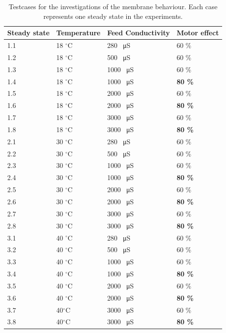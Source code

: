\begin{table}[H]
\centering
\begin{tabular}{|p{1.4cm}||p{2cm}|p{3.2cm}|p{1.8cm}|}
 \hline
 \textbf{Steady state }&Temperature&Feed Conductivity&Motor effect \\
 \hline
 1.1 & 18 $^\circ$C   & 280 \SI{}{\micro\siemens} & 60 \% \\
 1.2   &  18 $^\circ$C   & 500 \SI{}{\micro\siemens} & 60 \% \\
 1.3 &  18 $^\circ$C  &1000 \SI{}{\micro\siemens} & 60 \% \\
 1.4 &  18 $^\circ$C  &1000 \SI{}{\micro\siemens} & \textbf{80 \%} \\
 1.5 &18 $^\circ$C &2000 \SI{}{\micro\siemens}& 60 \%\\
 1.6 &18 $^\circ$C  &2000 \SI{}{\micro\siemens}& \textbf{80 \%}\\
 1.7   &18 $^\circ$C & 3000 \SI{}{\micro\siemens}&60 \% \\
 1.8   &18 $^\circ$C&3000 \SI{}{\micro\siemens}& \textbf{80 \%}\\
 \hline
 2.1 & 30 $^\circ$C & 280 \SI{}{\micro\siemens}&60 \%\\
 2.2 & 30 $^\circ$C &500 \SI{}{\micro\siemens}& 60 \%\\
 2.3 & 30 $^\circ$C&1000 \SI{}{\micro\siemens}& 60 \%\\
 2.4 & 30 $^\circ$C&1000 \SI{}{\micro\siemens}& \textbf{80 \%}\\
 2.5 & 30 $^\circ$C&2000 \SI{}{\micro\siemens}& 60 \%\\
 2.6 & 30 $^\circ$C&2000 \SI{}{\micro\siemens}& \textbf{80 \%}\\
 2.7 & 30 $^\circ$C& 3000 \SI{}{\micro\siemens}&60 \%\\
 2.8 & 30 $^\circ$C& 3000 \SI{}{\micro\siemens}&\textbf{80 \%}\\
 \hline 
 3.1 & 40 $^\circ$C& 280 \SI{}{\micro\siemens}& 60 \%\\
 3.2 & 40 $^\circ$C &500 \SI{}{\micro\siemens}& 60 \%\\
 3.3 & 40 $^\circ$C  & 1000 \SI{}{\micro\siemens}& 60 \%\\
 3.4 & 40 $^\circ$C  & 1000 \SI{}{\micro\siemens}& \textbf{80 \%}\\
 3.5 & 40 $^\circ$C&2000 \SI{}{\micro\siemens}& 60 \%\\
 3.6 & 40 $^\circ$C &2000 \SI{}{\micro\siemens}& \textbf{80 \%}\\
 3.7 & 40$^\circ$C &3000 \SI{}{\micro\siemens}& 60 \%\\
 3.8 & 40$^\circ$C &3000 \SI{}{\micro\siemens}& \textbf{80 \%}\\
\hline
\end{tabular}
\caption{Testcases for the investigations of the membrane behaviour. Each case represents one steady state in the experiments.}
    \label{tab:test cases} 
\end{table}


